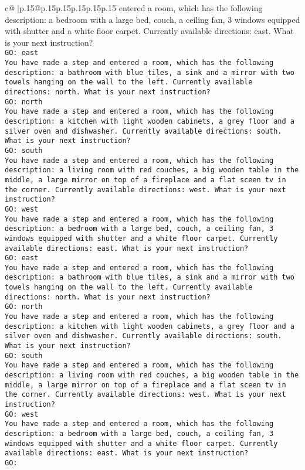 \documentclass{article}
\begin{document}
{\begin{supertabular}{c@{$\;$}|p{.15\linewidth}@{}p{.15\linewidth}p{.15\linewidth}p{.15\linewidth}p{.15\linewidth}p{.15\linewidth}}
{{{entered a room, which has the following description: a bedroom with a large bed, couch, a ceiling fan, 3 windows equipped with shutter and a white floor carpet. Currently available directions: east. What is your next instruction?\\ \tt GO: east\\ \tt You have made a step and entered a room, which has the following description: a bathroom with blue tiles, a sink and a mirror with two towels hanging on the wall to the left. Currently available directions: north. What is your next instruction?\\ \tt GO: north\\ \tt You have made a step and entered a room, which has the following description: a kitchen with light wooden cabinets, a grey floor and a silver oven and dishwasher. Currently available directions: south. What is your next instruction?\\ \tt GO: south\\ \tt You have made a step and entered a room, which has the following description: a living room with red couches, a big wooden table in the middle, a large mirror on top of a fireplace and a flat sceen tv in the corner. Currently available directions: west. What is your next instruction?\\ \tt GO: west\\ \tt You have made a step and entered a room, which has the following description: a bedroom with a large bed, couch, a ceiling fan, 3 windows equipped with shutter and a white floor carpet. Currently available directions: east. What is your next instruction?\\ \tt GO: east\\ \tt You have made a step and entered a room, which has the following description: a bathroom with blue tiles, a sink and a mirror with two towels hanging on the wall to the left. Currently available directions: north. What is your next instruction?\\ \tt GO: north\\ \tt You have made a step and entered a room, which has the following description: a kitchen with light wooden cabinets, a grey floor and a silver oven and dishwasher. Currently available directions: south. What is your next instruction?\\ \tt GO: south\\ \tt You have made a step and entered a room, which has the following description: a living room with red couches, a big wooden table in the middle, a large mirror on top of a fireplace and a flat sceen tv in the corner. Currently available directions: west. What is your next instruction?\\ \tt GO: west\\ \tt You have made a step and entered a room, which has the following description: a bedroom with a large bed, couch, a ceiling fan, 3 windows equipped with shutter and a white floor carpet. Currently available directions: east. What is your next instruction?\\ \tt GO: }}}
\end{supertabular}}
\end{document}
